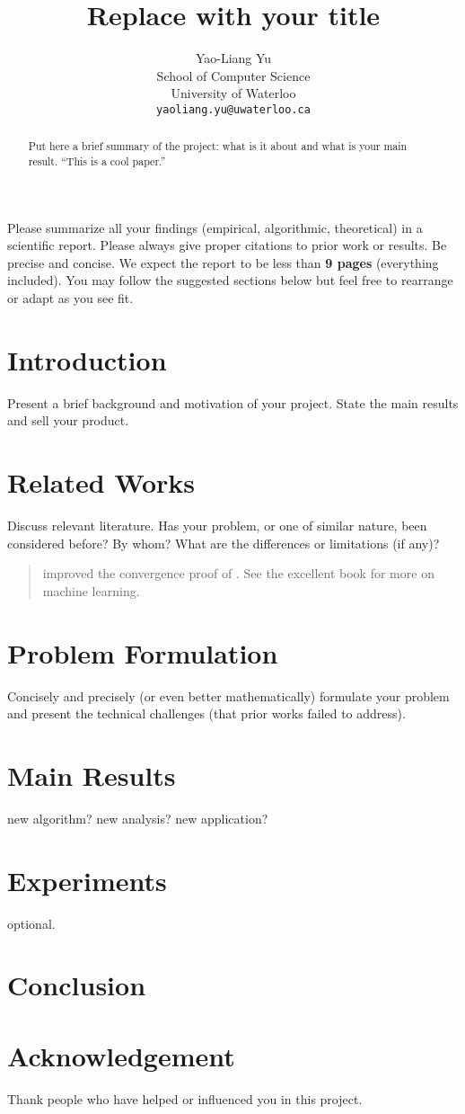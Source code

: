 \documentclass{article}
\title{Replace with your title}
\author{
	Yao-Liang Yu \\
	School of Computer Science\\
	University of Waterloo\\
	\texttt{yaoliang.yu@uwaterloo.ca} 
}
\begin{document}
\maketitle

\begin{abstract} 
Put here a brief summary of the project: what is it about and what is your main result.  ``This is a cool paper.''
\end{abstract} 

Please summarize all your findings (empirical, algorithmic, theoretical) in a scientific report. Please always give proper citations to prior work or results. Be precise and concise. We expect the report to be less than \textbf{9 pages} (everything included). You may follow the suggested sections below but feel free to rearrange or adapt as you see fit.

\section{Introduction}
Present a brief background and motivation of your project. State the main results and sell your product. 

\section{Related Works}
Discuss relevant literature. Has your problem, or one of similar nature, been considered before? By whom? What are the differences or limitations (if any)? 

\begin{quote}
\textcite{Novikoff62} improved the convergence proof of \textcite{Block62}. See the excellent book \parencite{SS14} for more on machine learning.
\end{quote}

\section{Problem Formulation}
Concisely and precisely (or even better mathematically) formulate your problem and present the technical challenges (that prior works failed to address).

\section{Main Results}
new algorithm? new analysis? new application?

\section{Experiments}
optional.

\section{Conclusion}


\newpage

\section*{Acknowledgement}
Thank people who have helped or influenced you in this project.

\printbibliography[title={References}]
\end{document}
